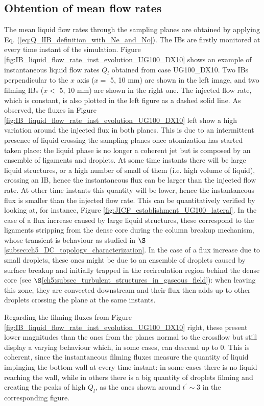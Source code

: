 \vspace*{-0.25in}

\subsection{Obtention of mean flow rates}

The mean liquid flow rates through the sampling planes are obtained by applying Eq. (\ref{eq:Q_lIB_definition_with_Ne_and_No}). The IBs are firstly monitored at every time instant of the simulation. Figure \ref{fig:IB_liquid_flow_rate_inst_evolution_UG100_DX10} shows an example of instantaneous liquid flow rates $Q_l$ obtained from case UG100\_DX10. Two IBs perpendicular to the $x$ axis ($x = $ 5, 10 mm) are shown in the left image, and two filming IBs ($x < $ 5, 10 mm) are shown in the right one. The injected flow rate, which is constant, is also plotted in the left figure as a dashed solid line. As observed, the fluxes in Figure \ref{fig:IB_liquid_flow_rate_inst_evolution_UG100_DX10} left show a high variation around the injected flux in both planes. This is due to an intermittent presence of liquid crossing the sampling planes once atomization has started taken place: the liquid phase is no longer a coherent jet but is composed by an ensemble of ligaments and droplets. At some time instants there will be large liquid structures, or a high number of small of them (i.e. high volume of liquid), crossing an IB, hence the instantaneous flux can be larger than the injected flow rate. At other time instants this quantity will be lower, hence the instantaneous flux is smaller than the injected flow rate. This can be quantitatively verified by looking at, for instance, Figure \ref{fig:JICF_establishment_UG100_lateral}. In the case of a flux increase caused by large liquid structures, these correspond to the ligaments stripping from the dense core during the column breakup mechanism, whose transient is behaviour as studied in $\S$\ref{subsec:ch5_DC_topology_characterization}. In the case of a flux increase due to small droplets, these ones might be due to an ensemble of droplets caused by surface breakup and initially trapped in the recirculation region behind the dense core (see $\S$\ref{ch5:subsec_turbulent_structures_in_gaseous_field}): when leaving this zone, they are convected downstream and their flux then adds up to other droplets crossing the plane at the same instants. 

Regarding the filming fluxes from Figure \ref{fig:IB_liquid_flow_rate_inst_evolution_UG100_DX10} right, these present lower magnitudes than the ones from the planes normal to the crossflow but still display a varying behaviour which, in some cases, can descend up to $0$. This is coherent, since the instantaneous filming fluxes measure the quantity of liquid impinging the bottom wall at every time instant: in some cases there is no liquid reaching the wall, while in others there is a big quantity of droplets filming and creating the peaks of high $Q_l$, as the ones shown around $t^{\prime} \sim 3$ in the corresponding figure.


